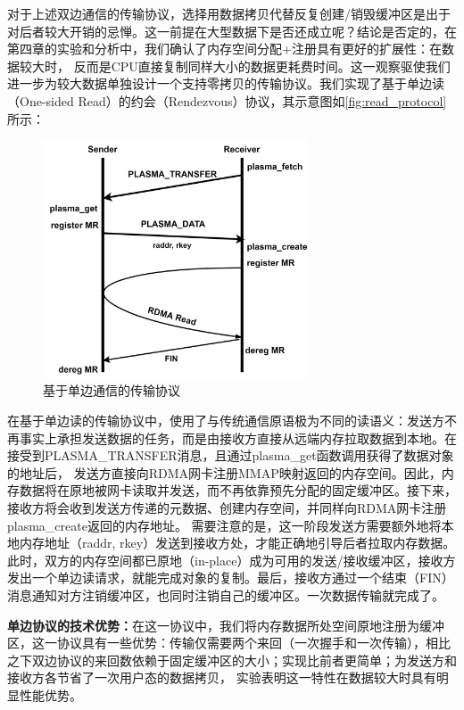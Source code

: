 对于上述双边通信的传输协议，选择用数据拷贝代替反复创建/销毁缓冲区是出于对后者较大开销的忌惮。这一前提在大型数据下是否还成立呢？结论是否定的，在第四章的实验和分析中，我们确认了内存空间分配+注册具有更好的扩展性：在数据较大时，
反而是CPU直接复制同样大小的数据更耗费时间。这一观察驱使我们进一步为较大数据单独设计一个支持零拷贝的传输协议。我们实现了基于单边读（One-sided Read）的约会（Rendezvous）协议，其示意图如\autoref{fig:read_protocol}所示：

\begin{figure}[h]
	\centering
	\includegraphics[width=0.7\textwidth]{image/chap03/read_protocol.png}
	\caption{基于单边通信的传输协议}
	\label{fig:read_protocol}
\end{figure}

在基于单边读的传输协议中，使用了与传统通信原语极为不同的读语义：发送方不再事实上承担发送数据的任务，而是由接收方直接从远端内存拉取数据到本地。在接受到PLASMA\_TRANSFER消息，且通过plasma\_get函数调用获得了数据对象的地址后，
发送方直接向RDMA网卡注册MMAP映射返回的内存空间。因此，内存数据将在原地被网卡读取并发送，而不再依靠预先分配的固定缓冲区。接下来，接收方将会收到发送方传递的元数据、创建内存空间，并同样向RDMA网卡注册plasma\_create返回的内存地址。
需要注意的是，这一阶段发送方需要额外地将本地内存地址（raddr, rkey）发送到接收方处，才能正确地引导后者拉取内存数据。
此时，双方的内存空间都已原地（in-place）成为可用的发送/接收缓冲区，接收方发出一个单边读请求，就能完成对象的复制。最后，接收方通过一个结束（FIN）消息通知对方注销缓冲区，也同时注销自己的缓冲区。一次数据传输就完成了。

\textbf{单边协议的技术优势：}在这一协议中，我们将内存数据所处空间原地注册为缓冲区，这一协议具有一些优势：传输仅需要两个来回（一次握手和一次传输），相比之下双边协议的来回数依赖于固定缓冲区的大小；实现比前者更简单；为发送方和接收方各节省了一次用户态的数据拷贝，
实验表明这一特性在数据较大时具有明显性能优势。

